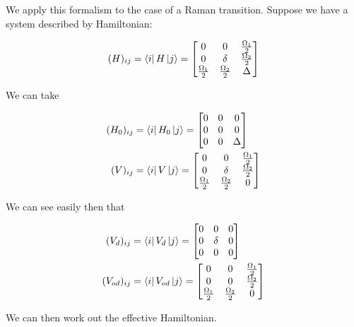 \documentclass[12pt]{article}
\begin{document}
We apply this formalism to the case of a Raman transition. Suppose we have a system described by Hamiltonian:

\begin{equation}
(H)_{ij} = \bra{i}H\ket{j} = \begin{bmatrix}
0 & 0 & \frac{\Omega_1}{2}\\
0 & \delta & \frac{\Omega_2}{2}\\
\frac{\Omega_1}{2} & \frac{\Omega_2}{2} & \Delta
\end{bmatrix}
\end{equation}

We can take

\begin{equation}
\begin{split}
(H_0)_{ij} &= \bra{i}H_0\ket{j} = \begin{bmatrix}
0 & 0 & 0\\
0 & 0 & 0\\
0 & 0 & \Delta
\end{bmatrix}\\
(V)_{ij} &= \bra{i}V\ket{j} = \begin{bmatrix}
0 & 0 & \frac{\Omega_1}{2}\\
0 & \delta & \frac{\Omega_2}{2}\\
\frac{\Omega_1}{2} & \frac{\Omega_2}{2} & 0
\end{bmatrix}
\end{split}
\end{equation}

We can see easily then that

\begin{equation}
\begin{split}
(V_d)_{ij} &= \bra{i}V_d\ket{j} = \begin{bmatrix}
0 & 0 & 0\\
0 & \delta &0\\
0 & 0 & 0
\end{bmatrix}\\
(V_{od})_{ij} &= \bra{i}V_{od}\ket{j} = \begin{bmatrix}
0 & 0 & \frac{\Omega_1}{2}\\
0 & 0 & \frac{\Omega_2}{2}\\
\frac{\Omega_1}{2} & \frac{\Omega_2}{2} & 0
\end{bmatrix}
\end{split}
\end{equation}

We can then work out the effective Hamiltonian.
\end{document}
